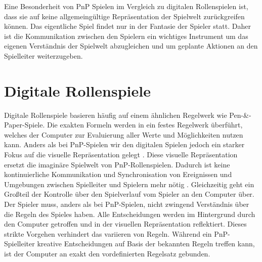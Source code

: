 Eine Besonderheit von PnP Spielen im Vergleich zu digitalen Rollenspielen ist, dass sie auf keine allgemeingültige Repräsentation der Spielwelt zurückgreifen können. Das eigentliche Spiel findet nur in der Fantasie der Spieler statt. Daher ist die Kommunikation zwischen den Spielern ein wichtiges Instrument um das eigenen Verständnis der Spielwelt abzugleichen und um geplante Aktionen an den Spielleiter weiterzugeben.\cite{Drachen2008}

\section{Digitale Rollenspiele}
\label{sec:DigitaleRollenspiele}
%

Digitale Rollenspiele basieren häufig auf einem ähnlichen Regelwerk wie Pen-\&-Paper-Spiele. Die exakten Formeln werden in ein festes Regelwerk überführt, welches der Computer zur Evaluierung aller Werte und Möglichkeiten nutzen kann. Anders als bei PnP-Spielen wir den digitalen Spielen jedoch ein starker Fokus auf die visuelle Repräsentation gelegt \cite{Tychsen2006}. Diese visuelle Repräsentation ersetzt die imaginäre Spielwelt von PnP-Rollenspielen. Dadurch ist keine kontinuierliche Kommunikation und Synchronisation von Ereignissen und Umgebungen zwischen Spielleiter und Spielern mehr nötig \cite{Drachen2008}.\newline
Gleichzeitig geht ein Großteil der Kontrolle über den Spielverlauf vom Spieler an den Computer über. Der Spieler muss, anders als bei PnP-Spielen, nicht zwingend Verständnis über die Regeln des Spieles haben. Alle Entscheidungen werden im Hintergrund durch den Computer getroffen und in der visuellen Repräsentation reflektiert. Dieses strikte Vorgehen verhindert das variieren von Regeln. Während ein PnP-Spielleiter kreative Entscheidungen auf Basis der bekannten Regeln treffen kann, ist der Computer an exakt den vordefinierten Regelsatz gebunden. \cite{Drachen2008}

